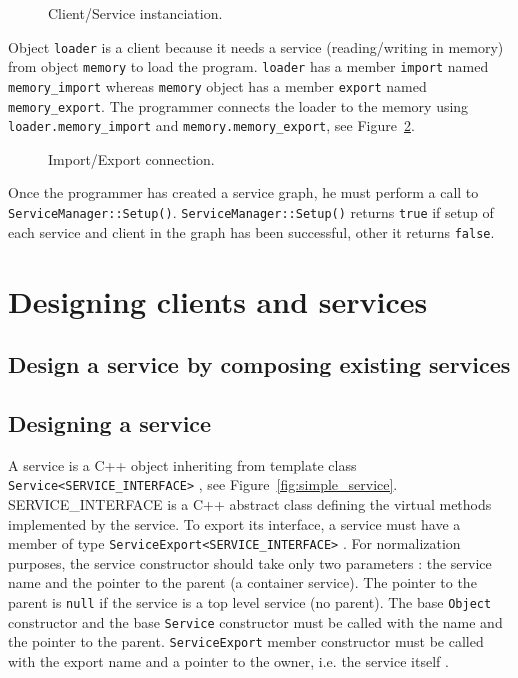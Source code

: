 \begin{figure}[h]
  \begin{center}
    
    \caption{\label{fig:instanciation} Client/Service instanciation.}
  \end{center}
\end{figure}

Object \texttt{loader} is a client because it needs a service (reading/writing in memory) from object \texttt{memory} to load the program.
\texttt{loader} has a member \texttt{import} named \texttt{memory\_import} whereas \texttt{memory} object has a member \texttt{export} named \texttt{memory\_export}.
The programmer connects the loader to the memory using \texttt{loader.memory\_import} and \texttt{memory.memory\_export}, see Figure~\ref{fig:connection}.

\begin{figure}[h]
  \begin{center}
    
    \caption{\label{fig:connection} Import/Export connection.}
  \end{center}
\end{figure}

Once \hfill the \hfill programmer \hfill has \hfill created \hfill a \hfill service \hfill graph, \hfill he \hfill must \hfill perform \hfill a \hfill call \hfill to \hfill \texttt{ServiceManager::Setup()}.
\texttt{ServiceManager::Setup()} returns \texttt{true} if setup of each service and client in the graph has been successful, other it returns \texttt{false}.

\section{Designing clients and services}
\label{designing_clients_and_services}

\subsection{Design a service by composing existing services}

\subsection{Designing a service}

A service is a C++ object inheriting from template class \texttt{Service<SERVICE\_INTERFACE>} , see Figure~\ref{fig:simple_service}.
SERVICE\_INTERFACE is a C++ abstract class defining the virtual methods implemented by the service.
To export its interface, a service must have a member of type \texttt{ServiceExport<SERVICE\_INTERFACE>} .
For normalization purposes, the service constructor should take only two parameters : the service name and the pointer to the parent (a container service).
The pointer to the parent is \texttt{null} if the service is a top level service (no parent).
The base \texttt{Object} constructor  and the base \texttt{Service} constructor  must be called with the name and the pointer to the parent.
\texttt{ServiceExport} member constructor must be called with the export name and a pointer to the owner, i.e. the service itself .

